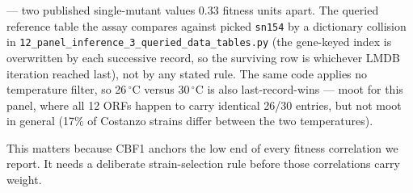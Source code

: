 
--- two published single-mutant values 0.33 fitness units apart. The queried reference table
the assay compares against picked \texttt{sn154} by a dictionary collision in
\texttt{12\_panel\_inference\_3\_queried\_data\_tables.py} (the gene-keyed index is
overwritten by each successive record, so the surviving row is whichever LMDB iteration
reached last), not by any stated rule. The same code applies no temperature filter, so 26\,$^\circ$C
versus 30\,$^\circ$C is also last-record-wins --- moot for this panel, where all 12 ORFs happen to
carry identical 26/30 entries, but not moot in general (17\% of Costanzo strains differ
between the two temperatures).

This matters because CBF1 anchors the low end of every fitness correlation we report. It needs
a deliberate strain-selection rule before those correlations carry weight.
